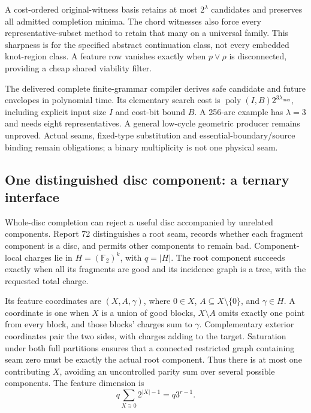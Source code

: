 A cost-ordered original-witness basis retains at most $2^\lambda$ candidates
and preserves all admitted completion minima. The chord witnesses also force
every representative-subset method to retain that many on a universal family.
This sharpness is for the specified abstract continuation class, not every
embedded knot-region class. A feature row vanishes exactly when
$p\vee\rho$ is disconnected, providing a cheap shared viability filter.

The delivered complete finite-grammar compiler derives safe candidate and
future envelopes in polynomial time. Its elementary search cost is
$\operatorname{poly}(I,B)2^{3\lambda_{\max}}$, including explicit input size
$I$ and cost-bit bound $B$. A 256-arc example has $\lambda=3$ and needs eight
representatives. A general low-cycle geometric producer remains unproved.
Actual seams, fixed-type substitution and essential-boundary/source binding
remain obligations; a binary multiplicity is not one physical seam.

\subsection{One distinguished disc component: a ternary interface}

Whole-disc completion can reject a useful disc accompanied by unrelated
components. Report 72 distinguishes a root seam, records whether each
fragment component is a disc, and permits other components to remain bad.
Component-local charges lie in $H=(\mathbb F_2)^k$, with $q=|H|$.
The root component succeeds exactly when all its fragments are good and its
incidence graph is a tree, with the requested total charge.

Its feature coordinates are $(X,A,\gamma)$, where $0\in X$,
$A\subseteq X\setminus\{0\}$, and $\gamma\in H$. A coordinate is one when
$X$ is a union of good blocks, $X\setminus A$ omits exactly one point from
every block, and those blocks' charges sum to $\gamma$. Complementary
exterior coordinates pair the two sides, with charges adding to the target.
Saturation under both full partitions ensures that a connected restricted
graph containing seam zero must be exactly the actual root component. Thus
there is at most one contributing $X$, avoiding an uncontrolled parity sum
over several possible components. The feature dimension is
\[
 q\sum_{X\ni0}2^{|X|-1}=q3^{r-1}.
\]

